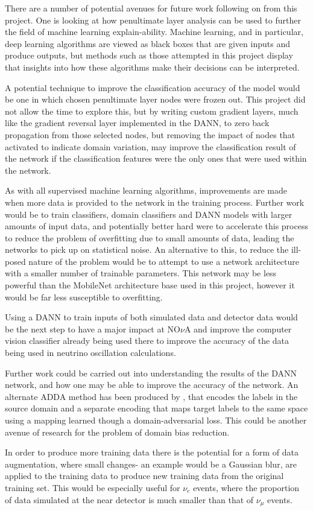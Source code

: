 \noindent There are a number of potential avenues for future work following on from this project. One is looking at how penultimate layer analysis can be used to further the field of machine learning explain-ability. Machine learning, and in particular, deep learning algorithms are viewed as black boxes that are given inputs and produce outputs, but methods such as those attempted in this project display that insights into how these algorithms make their decisions can be interpreted.\medskip

\noindent A potential technique to improve the classification accuracy of the model would be one in which chosen penultimate layer nodes were frozen out. This project did not allow the time to explore this, but by writing custom gradient layers, much like the gradient reversal layer implemented in the DANN, to zero back propagation from those selected nodes, but removing the impact of nodes that activated to indicate domain variation, may improve the classification result of the network if the classification features were the only ones that were used within the network.\medskip

\noindent As with all supervised machine learning algorithms, improvements are made when more data is provided to the network in the training process. Further work would be to train classifiers, domain classifiers and DANN models with larger amounts of input data, and potentially better hard were to accelerate this process to reduce the problem of overfitting due to small amounts of data, leading the networks to pick up on statistical noise. An alternative to this, to reduce the ill-posed nature of the problem would be to attempt to use a network architecture with a smaller number of trainable parameters. This network may be less powerful than the MobileNet architecture base used in this project, however it would be far less susceptible to overfitting.\medskip

\noindent Using a DANN to train inputs of both simulated data and detector data would be the next step to have a major impact at NO$\nu$A and improve the computer vision classifier already being used there to improve the accuracy of the data being used in neutrino oscillation calculations. \medskip

\noindent Further work could be carried out into understanding the results of the DANN network, and how one may be able to improve the accuracy of the network. An alternate ADDA method has been produced by \cite{Tzeng}, that encodes the labels in the source domain and a separate encoding that maps target labels to the same space using a mapping learned though a domain-adversarial loss. This could be another avenue of research for the problem of domain bias reduction.\medskip

\noindent In order to produce more training data there is the potential for a form of data augmentation, where small changes- an example would be a Gaussian blur, are applied to the training data to produce new training data from the original training set. This would be especially useful for $\nu_e$ events, where the proportion of data simulated at the near detector is much smaller than that of $\nu_\mu$ events.\medskip


